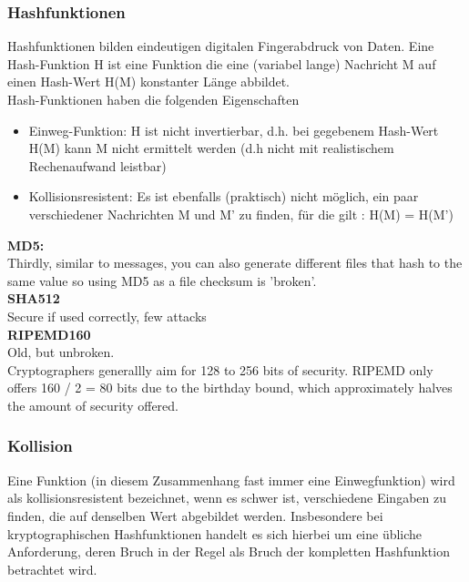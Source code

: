 \documentclass[12pt,a4paper]{article}
\begin{document}
\subsubsection{Hashfunktionen}
Hashfunktionen bilden eindeutigen digitalen Fingerabdruck von Daten. Eine Hash-Funktion H ist eine Funktion die eine (variabel lange) Nachricht M auf einen Hash-Wert H(M) konstanter Länge abbildet.\\
Hash-Funktionen haben die folgenden Eigenschaften
\begin{itemize}
    \item Einweg-Funktion: H ist nicht invertierbar, d.h. bei gegebenem Hash-Wert H(M) kann M nicht ermittelt werden (d.h nicht mit realistischem Rechenaufwand leistbar)
    \item Kollisionsresistent: Es ist ebenfalls (praktisch) nicht möglich, ein paar verschiedener Nachrichten M und M’ zu finden, für die gilt : H(M) = H(M’)
\end{itemize}

\textbf{MD5:} \\
	Thirdly, similar to messages, you can also generate different files that hash to the same value so using MD5 as a file checksum is 'broken'.\\
\textbf{SHA512} \\
	Secure if used correctly, few attacks\\
\textbf{RIPEMD160} \\
Old, but unbroken. \\
Cryptographers generallly aim for 128 to 256 bits of security. RIPEMD only offers 160 / 2 = 80 bits due to the birthday bound, 
	  which approximately halves the amount of security offered. \\
\subsubsection{Kollision}
Eine Funktion (in diesem Zusammenhang fast immer eine Einwegfunktion) wird als kollisionsresistent bezeichnet, wenn es schwer ist, 
	  verschiedene Eingaben zu finden, die auf denselben Wert abgebildet werden. Insbesondere bei kryptographischen 
	  Hashfunktionen handelt es sich hierbei um eine übliche Anforderung, deren Bruch in der Regel als Bruch der 
	  kompletten Hashfunktion betrachtet wird. 
\end{document}
